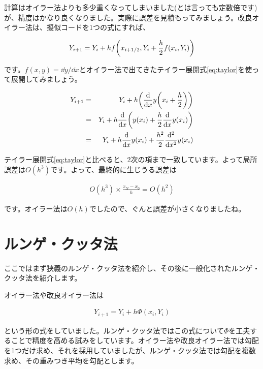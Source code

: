 計算はオイラー法よりも多少重くなってしまいました(とは言っても定数倍です)が、精度はかなり良くなりました。実際に誤差を見積もってみましょう。改良オイラー法は、擬似コードを1つの式にすれば、

\begin{eqnarray}
    Y_{i+1}=Y_i+hf\pqty{x_{i+1/2},Y_i+\frac{h}{2}f(x_i,Y_i)}
\end{eqnarray}

\noindent
です。$f(x,y)=\dd y/\dd x$とオイラー法で出てきたテイラー展開式\ref{eq:taylor}を使って展開してみましょう。

\begin{eqnarray}
    Y_{i+1}&=&Y_i+h\pqty{\frac{\dd}{\dd x}y\pqty{x_i+\frac{h}{2}}} \\
    &=&Y_i+h\frac{\dd}{\dd x}\pqty{y(x_i)+\frac{h}{2}\frac{\dd}{\dd x}y(x_i)} \nonumber \\
    &=&Y_i+h\frac{\dd}{\dd x}y(x_i)+\frac{h^2}{2}\frac{\dd^2}{\dd x^2}y(x_i) \setcounter{equation}{9}
\end{eqnarray}

テイラー展開式\ref{eq:taylor}と比べると、2次の項まで一致しています。よって局所誤差は$O(h^3)$です。よって、最終的に生じうる誤差は

\begin{eqnarray}
    O(h^3)\times \frac{x_N-x_0}{h}=O(h^2)
\end{eqnarray}

です。オイラー法は$O(h)$でしたので、ぐんと誤差が小さくなりましたね。







\section{ルンゲ・クッタ法}
\label{runge-kutta}
ここではまず狭義のルンゲ・クッタ法を紹介し、その後に一般化されたルンゲ・クッタ法を紹介します。

オイラー法や改良オイラー法は

\begin{eqnarray}
    Y_{i+1}=Y_i+h\Phi(x_i,Y_i)
\end{eqnarray}

\noindent
という形の式をしていました。ルンゲ・クッタ法ではこの式について$\Phi$を工夫することで精度を高める試みをしています。オイラー法や改良オイラー法では勾配を1つだけ求め、それを採用していましたが、ルンゲ・クッタ法では勾配を複数求め、その重みつき平均を勾配とします。

